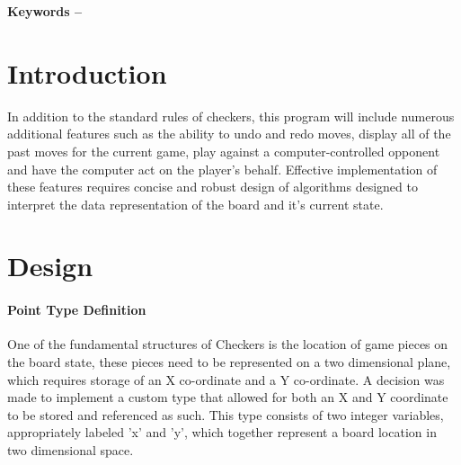 \documentclass[10pt, a4paper]{article}
\title{\mytitle}
\author{\myauthor\hspace{1em}\\\contact\\Edinburgh Napier University\hspace{0.5em}-\hspace{0.5em}\mymodule}
\date{}
\begin{document}
	\maketitle
	\begin{abstract}
	    Checkers - or English Draughts - is a well-known strategy game played on a black and white checkerboard. Each player has twelve pieces, which they can use to move across the board, and to capture opponent pieces. Movement of pieces is limited to only the black spaces on the board, meaning that all movement is diagonal. Certain challenges are faced when implementing a board game in digital form, and Checkers is no exception. Implementing Checkers as a computer program requires numerous data structures to represent the board state and various complex algorithms to provide consistent and accurate gameplay. 
	    
	\end{abstract}
    
	\textbf{Keywords -- }{\mykeywords}

	\section{Introduction}
    In addition to the standard rules of checkers, this program will include numerous additional features such as the ability to undo and redo moves, display all of the past moves for the current game, play against a computer-controlled opponent and have the computer act on the player's behalf.
    Effective implementation of these features requires concise and robust design of algorithms designed to interpret the data representation of the board and it's current state.
    
	\section{Design}
	\paragraph{Point Type Definition}
	One of the fundamental structures of Checkers is the location of game pieces on the board state, these pieces need to be represented on a two dimensional plane, which requires storage of an X co-ordinate and a Y co-ordinate. A decision was made to implement a custom type that allowed for both an X and Y coordinate to be stored and referenced as such. This type consists of two integer variables, appropriately labeled 'x' and 'y', which together represent a board location in two dimensional space.
\end{document}
